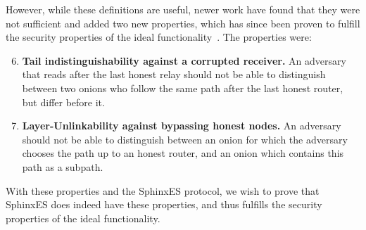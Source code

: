However, while these definitions are useful, newer work have found
that they were not sufficient and added two new properties, which has
since been proven to fulfill the security properties of the ideal
functionality~\cite{kuhn}. The properties were:

\begin{enumerate}
  \setcounter{enumi}{5}
  \item{{\bf Tail indistinguishability against a corrupted receiver.}
    An adversary that reads after the last honest relay should not be
    able to distinguish between two onions who follow the same path
    after the last honest router, but differ before it.}

  \item{{\bf Layer-Unlinkability against bypassing honest nodes.} An
    adversary should not be able to distinguish between an onion for
    which the adversary chooses the path up to an honest router, and
    an onion which contains this path as a subpath.}
\end{enumerate}

With these properties and the SphinxES protocol, we wish to prove that
SphinxES does indeed have these properties, and thus fulfills the
security properties of the ideal functionality. 
